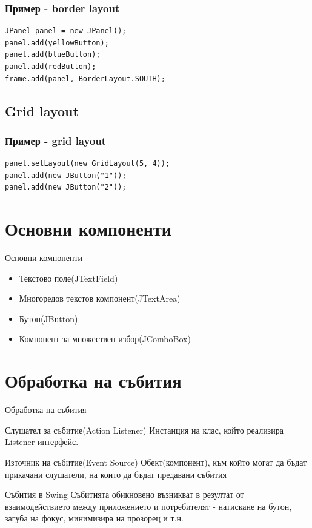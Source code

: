 \documentclass{beamer}
\begin{document}
\begin{frame}[fragile]
  \frametitle{Пример - border layout}
  \transdissolve
\begin{lstlisting}
JPanel panel = new JPanel();
panel.add(yellowButton);
panel.add(blueButton);
panel.add(redButton);
frame.add(panel, BorderLayout.SOUTH);  
\end{lstlisting}
\end{frame}

\subsection{Grid layout}
\begin{frame}[fragile]
  \frametitle{Пример - grid layout}
  \transdissolve
\begin{lstlisting}
panel.setLayout(new GridLayout(5, 4));
panel.add(new JButton("1"));
panel.add(new JButton("2"));  
\end{lstlisting}
\end{frame}

\section{Основни компоненти}

\begin{frame}{Основни компоненти}
  \transdissolve
  \begin{itemize}
  \item Текстово поле(JTextField)
  \item Многоредов текстов компонент(JTextArea)
  \item Бутон(JButton)
  \item Компонент за множествен избор(JComboBox)
  \end{itemize}
\end{frame}

\section{Обработка на събития}

\begin{frame}{Обработка на събития}
  \transdissolve
  \begin{block}{Слушател за събитие(Action Listener)}
    Инстанция на клас, който реализира Listener интерфейс.
  \end{block}
  \begin{block}{Източник на събитие(Event Source)}
    Обект(компонент), към който могат да бъдат прикачани слушатели, на
    които да бъдат предавани събития
  \end{block}
  \begin{block}{Събития в Swing}
    Събитията обикновено възникват в резултат от взаимодействието
    между приложението и потребителят - натискане на бутон, загуба на
    фокус, минимизира на прозорец и т.н.
  \end{block}
\end{frame}
\end{document}
